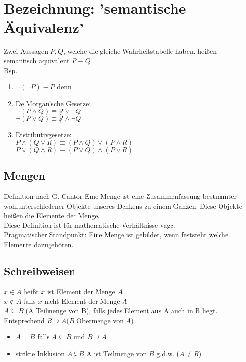 \section{Bezeichnung: 'semantische Äquivalenz'}
Zwei Aussagen $P, Q$, welche die gleiche Wahrheitstabelle haben, heißen semantisch äquivalent $P \equiv Q$\\
Bsp.
\begin{enumerate}
\item $\neg(\neg P) \equiv P$ denn %
\item De Morgan'sche Gesetze:\\
$\neg (P \wedge Q) \equiv \not P \vee \neg Q$\\
$\neg (P \vee Q) \equiv \not P \wedge \neg Q$
\item Distributivgesetze:\\
$P \wedge (Q \vee R) \equiv (P \wedge Q) \vee (P \wedge R)$\\
$P \vee (Q \wedge R) \equiv (P \vee Q) \wedge (P \vee R)$
\end{enumerate}
\subsection*{Mengen}
Definition nach G. Cantor Eine Menge ist eine Zusammenfassung bestimmter wohlunterschiedener Objekte unseres Denkens zu einem Ganzen. Diese Objekte heißen die Elemente der Menge.\\
Diese Definition ist für mathematische Verhältnisse vage.\\
Pragmatischer Standpunkt: Eine Menge ist gebildet, wenn feststeht welche Elemente dazugehören.\\
\subsection*{Schreibweisen}
$x \in A$ heißt $x$ ist Element der Menge $A$\\
$x \notin A$ falls $x$ nicht Element der Menge $A$\\
$A \subseteq B$ (A Teilmenge von B), falls jedes Element aus A auch in B liegt.\\
Entsprechend $B \supseteq A (B$ Obermenge von $A)$\\
\begin{itemize}
\item $A = B$ falls $A \subseteq B$ und $B \supseteq A$
\item strikte Inklusion $A \subsetneqq B$ A ist Teilmenge von $B$ g.d.w. ($A \neq B$)
\end{itemize}

